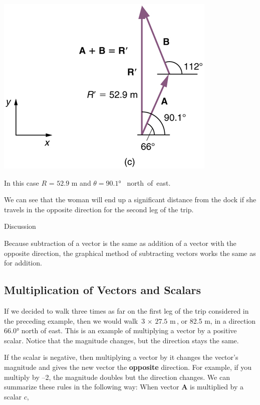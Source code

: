 \documentclass[
]{book}
\newenvironment{tinysection}{}{}
\begin{document}
\includegraphics{images/Figure_03_02_17a.jpg}

In this case \(R\text{~=~52.9\ m}\) and \({\theta = \text{90.1°}}{}\)
~north~of~east.

We can see that the woman will end up a significant distance from the
dock if she travels in the opposite direction for the second leg of the
trip.

\begin{tinysection}

{Discussion}

\end{tinysection}

Because subtraction of a vector is the same as addition of a vector with
the opposite direction, the graphical method of subtracting vectors
works the same as for addition.

\hypertarget{fs-id1165298652611}{}
\hypertarget{multiplication-of-vectors-and-scalars}{%
\subsection{Multiplication of Vectors and Scalars}\label{multiplication-of-vectors-and-scalars}}

If we decided to walk three times as far on the first leg of the trip
considered in the preceding example, then we would walk
\({{\text{3~} \times \text{~27}}\text{.}\text{5\ m}}{}\), or 82.5 m, in a
direction \({\text{66}\text{.}0\text{°}}{}\) north of east. This is an
example of multiplying a vector by a positive
\protect\hypertarget{import-auto-id1165296219603}{}{scalar}. Notice that the
magnitude changes, but the direction stays the same.

If the scalar is negative, then multiplying a vector by it changes the
vector's magnitude and gives the new vector the \textbf{opposite} direction.
For example, if you multiply by --2, the magnitude doubles but the
direction changes. We can summarize these rules in the following way:
When vector \(\mathbf{A}{}\) is multiplied by a scalar \(c{}\),
\end{document}
